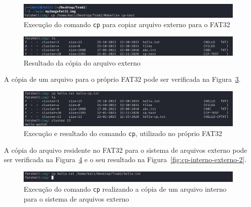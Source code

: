 \documentclass[
    12pt,				%
    oneside,   	        %
    a4paper,			%
    english,			%
    french,				%
    spanish,			%
    brazil,				%
    ]{pacotes/abntex2}
\begin{document}
\begin{figure}[H]
    \centering
    \includegraphics[width=450pt]{figuras/resultados/3.1-cp-externo-interno.PNG}
    \caption{Execução do comando \texttt{cp} para copiar arquivo externo para o FAT32}
    \label{fig:cp-externo-interno-1}
\end{figure}

\begin{figure}[H]
    \centering
    \includegraphics[width=450pt]{figuras/resultados/3.2-cp-externo-interno.PNG}
    \caption{Resultado da cópia do arquivo externo}
    \label{fig:cp-externo-interno-2}
\end{figure}

A cópia de um arquivo para o próprio FAT32 pode ser verificada na Figura~\ref{fig:cp-interno-attr}.

\begin{figure}[H]
    \centering
    \includegraphics[width=450pt]{figuras/resultados/5-cp-interno-attr.PNG}
    \caption{Execução e resultado do comando \texttt{cp}, utilizado no próprio FAT32}
    \label{fig:cp-interno-attr}
\end{figure}

A cópia do arquivo residente no FAT32 para o sistema de arquivos externo pode ser verificada na Figura~\ref{fig:cp-interno-externo-1} e o seu resultado na Figura~\ref{fig:cp-interno-externo-2}.

\begin{figure}[H]
    \centering
    \includegraphics[width=450pt]{figuras/resultados/6-cp-interno-externo.PNG}
    \caption{Execução do comando \texttt{cp} realizando a cópia de um arquivo interno para o sistema de arquivos externo}
    \label{fig:cp-interno-externo-1}
\end{figure}
\end{document}
